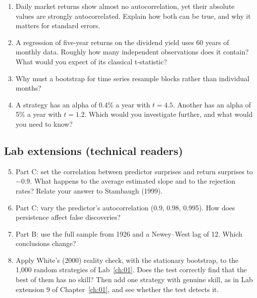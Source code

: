 \begin{enumerate}
  \item Daily market returns show almost no autocorrelation, yet their absolute values are strongly autocorrelated. Explain how both can be true, and why it matters for standard errors.
  \item A regression of five-year returns on the dividend yield uses 60 years of monthly data. Roughly how many independent observations does it contain? What would you expect of its classical t-statistic?
  \item Why must a bootstrap for time series resample blocks rather than individual months?
  \item A strategy has an alpha of 0.4\% a year with $t = 4.5$. Another has an alpha of 5\% a year with $t = 1.2$. Which would you investigate further, and what would you need to know?
\end{enumerate}

\subsection*{Lab extensions (technical readers)}

\begin{enumerate}
  \setcounter{enumi}{4}
  \item Part C: set the correlation between predictor surprises and return surprises to $-0.9$. What happens to the average estimated slope and to the rejection rates? Relate your answer to Stambaugh (1999).
  \item Part C: vary the predictor's autocorrelation (0.9, 0.98, 0.995). How does persistence affect false discoveries?
  \item Part B: use the full sample from 1926 and a Newey--West lag of 12. Which conclusions change?
  \item Apply White's (2000) reality check, with the stationary bootstrap, to the 1,000 random strategies of Lab~\ref{ch:01}. Does the test correctly find that the best of them has no skill? Then add one strategy with genuine skill, as in Lab extension 9 of Chapter~\ref{ch:01}, and see whether the test detects it.
\end{enumerate}
